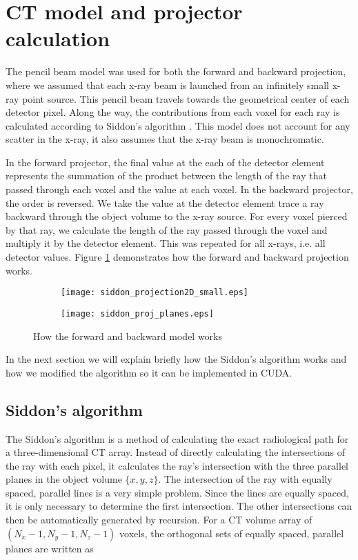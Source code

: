 \section{CT model and projector calculation}
The pencil beam model was used for both the forward and backward projection, where we assumed that each x-ray beam is launched from an infinitely small x-ray point source. This pencil beam travels towards the geometrical center of each detector pixel.  Along the way, the contributions from each voxel for each ray is calculated according to Siddon's algorithm \cite{Siddon1985}.  This model does not account for any scatter in the x-ray, it also assumes that the x-ray beam is monochromatic.

In the forward projector, the final value at the each of the detector element represents the summation of the product between the length of the ray that passed through each voxel and the value at each voxel.  In the backward projector, the order is reversed. We take the value at the detector element trace a ray backward through the object volume to the x-ray source.  For every voxel pierced by that ray, we calculate the length of the ray passed through the voxel and multiply it by the detector element.  This was repeated for all x-rays, i.e. all detector values.  Figure \ref{fig:forward_backward_model} demonstrates how the forward and backward projection works.

\begin{figure}
	\begin{subfigure}[b]{0.35\linewidth}
	\texttt{[image: siddon\_projection2D\_small.eps]}
	\end{subfigure}
\hspace{0.2cm}
	\begin{subfigure}[b]{0.35\linewidth}
	\texttt{[image: siddon\_proj\_planes.eps]}
	\end{subfigure}
\caption{How the forward and backward model works}
\label{fig:forward_backward_model}
\end{figure}

In the next section we will explain briefly how the Siddon's algorithm works and how we modified the algorithm so it can be implemented in CUDA. 

\subsection{Siddon's algorithm}
The Siddon's algorithm is a method of calculating the exact radiological path for a three-dimensional CT array.  Instead of directly calculating the intersections of the ray with each pixel, it calculates the ray's intersection with the three parallel planes in the object volume $\{ x, y, z \}$.  The intersection of the ray with equally spaced, parallel lines is a very simple problem.  Since the lines are equally spaced, it is only necessary to determine the first intersection.  The other intersections can then be automatically generated by recursion.  For a CT volume array of $(N_x -1, N_y-1, N_z-1)$ voxels, the orthogonal sets of equally spaced, parallel planes are written as

